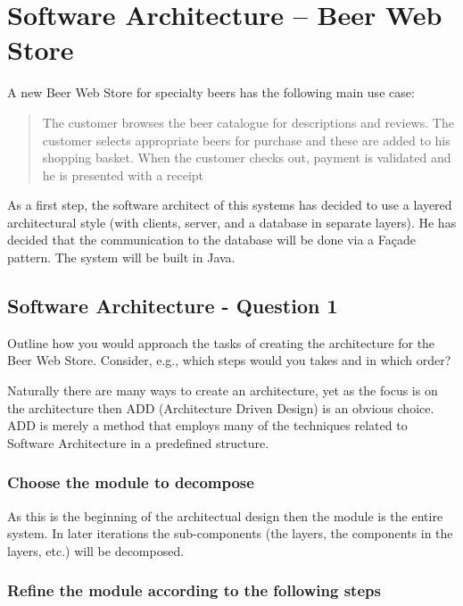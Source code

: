 \section{Software Architecture -- Beer Web Store}

A new Beer Web Store for specialty beers has the following main use
case:
\begin{quote}
  The customer browses the beer catalogue for descriptions and
  reviews. The customer selects appropriate beers for purchase and
  these are added to his shopping basket. When the customer checks
  out, payment is validated and he is presented with a receipt
\end{quote}
As a first step, the software architect of this systems has decided to
use a layered architectural style (with clients, server, and a
database in separate layers). He has decided that the communication to
the database will be done via a Fa\c cade pattern. The system will be
built in Java.

\subsection{Software Architecture - Question 1}
\begin{question}
Outline how you would approach the tasks of creating the
architecture for the Beer Web Store. Consider, e.g., which steps
would you takes and in which order?
\end{question}

Naturally there are many ways to create an architecture, yet as the focus is on the architecture then ADD (Architecture Driven Design) is an obvious choice. ADD is merely a method that employs many of the techniques related to Software Architecture in a predefined structure.

\subsubsection{Choose the module to decompose}
As this is the beginning of the architectual design then the module is the entire system. In later iterations the sub-components (the layers, the components in the layers, etc.) will be decomposed.

\subsubsection{Refine the module according to the following steps}

